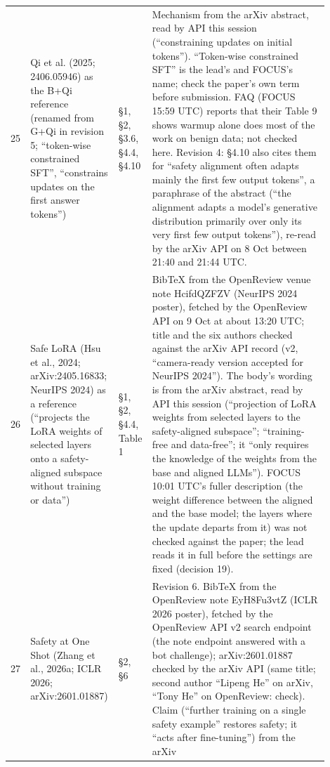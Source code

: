 \documentclass{article}
\theoremstyle{plain}
\theoremstyle{definition}
\theoremstyle{remark}
\begin{document}
\begin{longtable}{@{}L{0.03\linewidth}L{0.24\linewidth}L{0.08\linewidth}L{0.55\linewidth}@{}}
  25 & Qi et al. (2025; 2406.05946) as the B+Qi reference (renamed from G+Qi in
      revision 5; ``token-wise constrained SFT'', ``constrains updates on the
      first answer tokens'') & \S{}1, \S{}2, \S{}3.6, \S{}4.4, \S{}4.10 &
      Mechanism from the arXiv abstract, read by API this session
      (``constraining updates on initial tokens''). ``Token-wise constrained
      SFT'' is the lead's and FOCUS's name; check the paper's own term before
      submission. FAQ (FOCUS 15:59 UTC) reports that their Table 9 shows warmup
      alone does most of the work on benign data; not checked here. Revision 4:
      \S{}4.10 also cites them for ``safety alignment often adapts mainly the
      first few output tokens'', a paraphrase of the abstract (``the alignment
      adapts a model's generative distribution primarily over only its very
      first few output tokens''), re-read by the arXiv API on 8 Oct between
      21:40 and 21:44 UTC. \\
  26 & Safe LoRA (Hsu et al., 2024; arXiv:2405.16833; NeurIPS 2024) as a
      reference (``projects the LoRA weights of selected layers onto a
      safety-aligned subspace without training or data'') & \S{}1, \S{}2,
      \S{}4.4, Table 1 & BibTeX from the OpenReview venue note HcifdQZFZV
      (NeurIPS 2024 poster), fetched by the OpenReview API on 9 Oct at about
      13:20 UTC; title and the six authors checked against the arXiv API record
      (v2, ``camera-ready version accepted for NeurIPS 2024''). The body's
      wording is from the arXiv abstract, read by API this session (``projection
      of LoRA weights from selected layers to the safety-aligned subspace'';
      ``training-free and data-free''; it ``only requires the knowledge of the
      weights from the base and aligned LLMs''). FOCUS 10:01 UTC's fuller
      description (the weight difference between the aligned and the base model;
      the layers where the update departs from it) was not checked against the
      paper; the lead reads it in full before the settings are fixed (decision
      19). \\
  27 & Safety at One Shot (Zhang et al., 2026a; ICLR 2026; arXiv:2601.01887) &
      \S{}2, \S{}6 & Revision 6. BibTeX from the OpenReview note EyH8Fu3vtZ
      (ICLR 2026 poster), fetched by the OpenReview API v2 search endpoint (the
      note endpoint answered with a bot challenge); arXiv:2601.01887 checked by
      the arXiv API (same title; second author ``Lipeng He'' on arXiv, ``Tony
      He'' on OpenReview: check). Claim (``further training on a single safety
      example'' restores safety; it ``acts after fine-tuning'') from the arXiv

\end{longtable}
\end{document}
